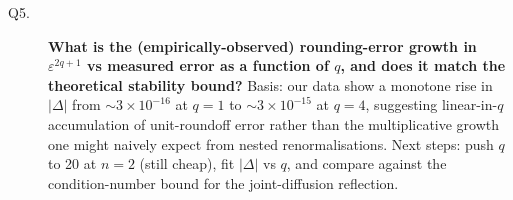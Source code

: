 \begin{description}
  \item[Q5.] \textbf{What is the (empirically-observed) rounding-error growth
    in \(\varepsilon^{2q+1}\) vs measured error as a function of $q$, and
    does it match the theoretical stability bound?}
    Basis: our data show a monotone rise in \(|\Delta|\) from
    \(\sim 3\!\times\!10^{-16}\) at \(q=1\) to \(\sim 3\!\times\!10^{-15}\)
    at \(q=4\), suggesting linear-in-\(q\) accumulation of unit-roundoff
    error rather than the multiplicative growth one might naively expect
    from nested renormalisations. Next steps: push \(q\) to 20 at \(n=2\)
    (still cheap), fit \(|\Delta|\) vs \(q\), and compare against the
    condition-number bound for the joint-diffusion reflection.
\end{description}
